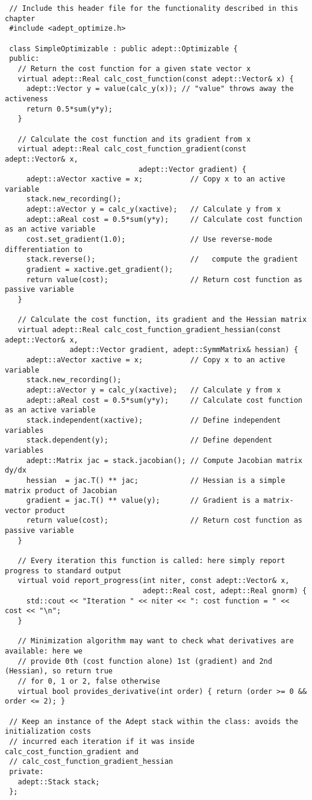 \documentclass[a4,oneside]{book}
\begin{document}
\begin{lstlisting}
 // Include this header file for the functionality described in this chapter
 #include <adept_optimize.h>

 class SimpleOptimizable : public adept::Optimizable {
 public:
   // Return the cost function for a given state vector x
   virtual adept::Real calc_cost_function(const adept::Vector& x) {
     adept::Vector y = value(calc_y(x)); // "value" throws away the activeness
     return 0.5*sum(y*y);
   }

   // Calculate the cost function and its gradient from x
   virtual adept::Real calc_cost_function_gradient(const adept::Vector& x,
					           adept::Vector gradient) {
     adept::aVector xactive = x;           // Copy x to an active variable
     stack.new_recording();
     adept::aVector y = calc_y(xactive);   // Calculate y from x
     adept::aReal cost = 0.5*sum(y*y);     // Calculate cost function as an active variable
     cost.set_gradient(1.0);               // Use reverse-mode differentiation to
     stack.reverse();                      //   compute the gradient
     gradient = xactive.get_gradient();
     return value(cost);                   // Return cost function as passive variable
   }

   // Calculate the cost function, its gradient and the Hessian matrix
   virtual adept::Real calc_cost_function_gradient_hessian(const adept::Vector& x,
			   adept::Vector gradient, adept::SymmMatrix& hessian) {
     adept::aVector xactive = x;           // Copy x to an active variable
     stack.new_recording();
     adept::aVector y = calc_y(xactive);   // Calculate y from x
     adept::aReal cost = 0.5*sum(y*y);     // Calculate cost function as an active variable
     stack.independent(xactive);           // Define independent variables
     stack.dependent(y);                   // Define dependent variables
     adept::Matrix jac = stack.jacobian(); // Compute Jacobian matrix dy/dx
     hessian  = jac.T() ** jac;            // Hessian is a simple matrix product of Jacobian
     gradient = jac.T() ** value(y);       // Gradient is a matrix-vector product
     return value(cost);                   // Return cost function as passive variable
   }

   // Every iteration this function is called: here simply report progress to standard output
   virtual void report_progress(int niter, const adept::Vector& x,
                                adept::Real cost, adept::Real gnorm) {
     std::cout << "Iteration " << niter << ": cost function = " << cost << "\n";
   }
 
   // Minimization algorithm may want to check what derivatives are available: here we 
   // provide 0th (cost function alone) 1st (gradient) and 2nd (Hessian), so return true
   // for 0, 1 or 2, false otherwise
   virtual bool provides_derivative(int order) { return (order >= 0 && order <= 2); }

 // Keep an instance of the Adept stack within the class: avoids the initialization costs
 // incurred each iteration if it was inside calc_cost_function_gradient and
 // calc_cost_function_gradient_hessian 
 private:
   adept::Stack stack;
 };
\end{lstlisting}
\end{document}
